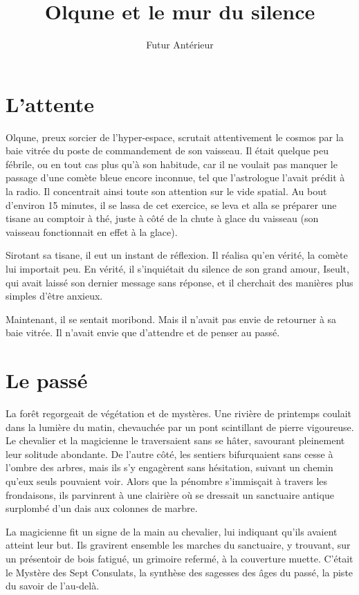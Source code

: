 \documentclass[a4paper,11pt, openany]{book}
\title{Olqune et le mur du silence}
\author{Futur Antérieur}
\date{}
\begin{document}
\maketitle

\chapter{L'attente}
Olqune, preux sorcier de l'hyper-espace, scrutait attentivement le cosmos par la baie vitrée du poste de commandement de son vaisseau.
Il était quelque peu fébrile, ou en tout cas plus qu'à son habitude, car il ne voulait pas manquer le passage d'une comète bleue encore inconnue, tel que l'astrologue l'avait prédit à la radio.
Il concentrait ainsi toute son attention sur le vide spatial. Au bout d'environ 15 minutes, il se lassa de cet exercice, se leva 
et alla se préparer une tisane au comptoir à thé, juste à côté de la chute à glace du vaisseau (son vaisseau fonctionnait en effet à la glace).

Sirotant sa tisane, il eut un instant de réflexion. Il réalisa qu'en vérité, la comète lui importait peu.
En vérité, il s'inquiétait du silence de son grand amour, Iseult, qui avait laissé son dernier message sans réponse, et il cherchait des manières plus simples d'être anxieux.

Maintenant, il se sentait moribond. Mais il n'avait pas envie de retourner à sa baie vitrée. Il n'avait envie que d'attendre et de penser au passé.

\chapter{Le passé}
La forêt regorgeait de végétation et de mystères. Une rivière de printemps coulait dans la lumière du matin, chevauchée par un pont scintillant de pierre vigoureuse.
Le chevalier et la magicienne le traversaient sans se hâter, savourant pleinement leur solitude abondante. 
De l'autre côté, les sentiers bifurquaient sans cesse à l'ombre des arbres, mais ils s'y engagèrent sans hésitation, suivant un chemin qu'eux seuls pouvaient voir.
Alors que la pénombre s'immisçait à travers les frondaisons, ils parvinrent à une clairière où se dressait un sanctuaire antique surplombé d'un dais aux colonnes de marbre. 

La magicienne fit un signe de la main au chevalier, lui indiquant qu'ils avaient atteint leur but. 
Ils gravirent ensemble les marches du sanctuaire, y trouvant, sur un présentoir de bois fatigué, un grimoire refermé, à la couverture muette.
C'était le Mystère des Sept Consulats, la synthèse des sagesses des âges du passé, la piste du savoir de l'au-delà.
\end{document}
